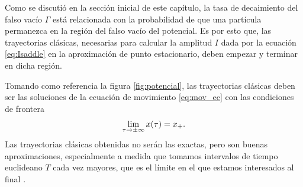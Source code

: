  

Como se discutió en la sección inicial de este capítulo, la tasa de decaimiento del falso vacío $\Gamma$ está relacionada con la probabilidad de que una partícula permanezca en la región del falso vacío del potencial. %
Es por esto que, las trayectorias clásicas, necesarias para calcular la amplitud $I$ dada por la ecuación \eqref{eq:Isaddle} en la aproximación de punto estacionario, deben empezar y terminar en dicha región. 

%
Tomando como referencia la figura \ref{fig:potencial}, las trayectorias clásicas deben ser las soluciones de la ecuación de movimiento \eqref{eq:mov_ec} con las condiciones de frontera \cite{coleman1977fate}
\begin{equation} \label{eq:cond_frontera}
	\lim_{\tau \rightarrow \pm\infty} x\qty(\tau) = x_+.
\end{equation} 
Las trayectorias clásicas obtenidas no serán las exactas, pero son buenas aproximaciones, especialmente a medida que tomamos intervalos de tiempo euclideano $T$ cada vez mayores, que es el límite en el que estamos interesados al final \cite{paranjape2017theory, callan1977fate}. 

